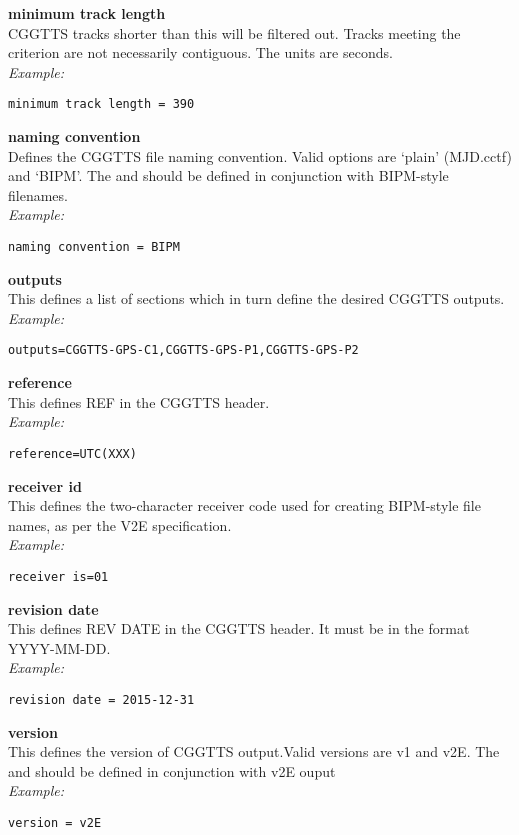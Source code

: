 {\bfseries minimum track length}\\
CGGTTS tracks shorter than this will be filtered out. Tracks meeting the criterion are not necessarily contiguous.
The units are seconds.\\
\textit{Example:}
\begin{lstlisting}
minimum track length = 390
\end{lstlisting}

{\bfseries naming convention}\\
Defines the CGGTTS file naming convention. Valid options are `plain' (MJD.cctf) and `BIPM'.
The  and  should be defined in conjunction with BIPM-style filenames.\\
\textit{Example:}
\begin{lstlisting}
naming convention = BIPM
\end{lstlisting}

{\bfseries outputs}\\
This defines a list of sections which in turn define the desired CGGTTS outputs.\\
\textit{Example:}
\begin{lstlisting}
outputs=CGGTTS-GPS-C1,CGGTTS-GPS-P1,CGGTTS-GPS-P2
\end{lstlisting}

{\bfseries reference}\\
This defines REF in the CGGTTS header.\\
\textit{Example:}
\begin{lstlisting}
reference=UTC(XXX)
\end{lstlisting}

{\bfseries receiver id}\\
This defines the two-character receiver code used for creating BIPM-style file names, 
as per the V2E specification.\\
\textit{Example:}
\begin{lstlisting}
receiver is=01
\end{lstlisting}

{\bfseries revision date}\\
This defines REV DATE in the CGGTTS header. It must be in the format YYYY-MM-DD.\\
\textit{Example:}
\begin{lstlisting}
revision date = 2015-12-31
\end{lstlisting}

{\bfseries version}\\
This defines the version of CGGTTS output.Valid versions are v1 and v2E. 
The  and  should be defined in conjunction with v2E ouput\\
\textit{Example:}
\begin{lstlisting}
version = v2E
\end{lstlisting}

